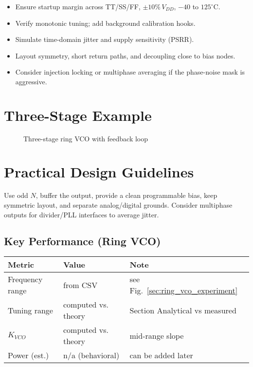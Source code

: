 \begin{itemize}
  \item Ensure startup margin across TT/SS/FF, $\pm10\%\,V_{DD}$, $-40$ to $125^\circ$C.
  \item Verify monotonic tuning; add background calibration hooks.
  \item Simulate time-domain jitter and supply sensitivity (PSRR).
  \item Layout symmetry, short return paths, and decoupling close to bias nodes.
  \item Consider injection locking or multiphase averaging if the phase-noise mask is aggressive.
\end{itemize}

\section{Three-Stage Example}
\begin{figure}[H]
  \centering
  \caption{Three-stage ring VCO with feedback loop}
\end{figure}

\section{Practical Design Guidelines}
Use odd \(N\), buffer the output, provide a clean programmable bias, keep symmetric layout, and separate analog/digital grounds. Consider multiphase outputs for divider/PLL interfaces to average jitter.


\subsection*{Key Performance (Ring VCO)}
\begin{table}[H]
  \centering
  \begin{tabular}{lll}
    \toprule
    Metric & Value & Note \\
    \midrule
    Frequency range & from CSV & see Fig.~\ref{sec:ring_vco_experiment} \\
    Tuning range & computed vs. theory & Section Analytical vs measured \\
    $K_{VCO}$ & computed vs. theory & mid-range slope \\
    Power (est.) & n/a (behavioral) & can be added later \\
    \bottomrule
  \end{tabular}
\end{table}

